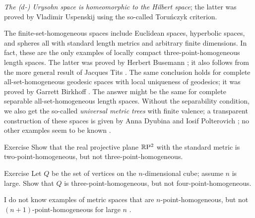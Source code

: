 \textit{The ($d$-) Urysohn space is homeomorphic to the Hilbert space};
the latter was proved by Vladimir Uspenskij \cite{uspenskij} using the so-called Toruńczyk criterion.

The finite-set-homogeneous spaces include Euclidean spaces, hyperbolic spaces, and spheres all with standard length metrics and arbitrary finite dimensions.
In fact, these are the only examples of locally compact three-point-homogeneous length spaces.
The latter was proved by Herbert Busemann \cite{busemann-1942}; it also follows from the more general result of Jacques Tits \cite{tits}.
The same conclusion holds for complete all-set-homogeneous geodesic spaces with local uniqueness of geodesics;
it was proved by Garrett Birkhoff \cite{birkhoff}.
The answer might be the same for complete separable all-set-homogeneous length spaces.
Without the separability condition, we also get the so-called \emph{universal metric trees} with finite valence; 
a transparent construction of these spaces is given by Anna Dyubina and Iosif Polterovich \cite{dyubina-polterovich}; no other examples seem to be known \cite{lebedeva-petrunin2211.09671}.  

{\sloppy

\begin{thm}{Exercise}\label{ex:RP-not}
Show that the real projective plane $\mathbb{R}\mathrm{P}^2$ with the standard metric is two-point-homogeneous, but not three-point-homogeneous.
\end{thm}

}

\begin{thm}{Exercise}\label{ex:hom-cube}
Let $Q$ be the set of vertices on the $n$-dimensional cube;
assume $n$ is large.
Show that $Q$ is three-point-homogeneous, but not four-point-homogeneous.
\end{thm}

I do not know examples of metric spaces that are $n$-point-homogeneous, but not $(n+1)$-point-homogeneous for large $n$ \cite{petrunin-431426}.
